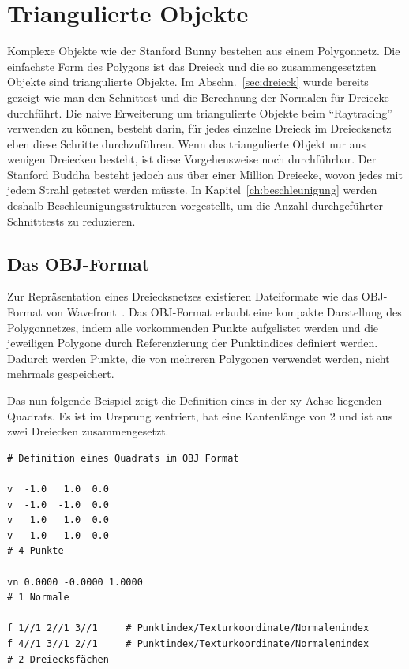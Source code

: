 
\chapter{Triangulierte Objekte}

Komplexe Objekte wie der Stanford Bunny bestehen aus einem Polygonnetz. Die einfachste Form des Polygons ist das Dreieck und die so zusammengesetzten Objekte sind triangulierte Objekte.
Im Abschn.~\ref{sec:dreieck} wurde bereits gezeigt wie man den Schnittest und die Berechnung der Normalen für Dreiecke durchführt.
Die naive Erweiterung um triangulierte Objekte beim "`Raytracing"' verwenden zu können, besteht darin, für jedes einzelne Dreieck im Dreiecksnetz eben diese Schritte durchzuführen. Wenn das triangulierte Objekt nur aus wenigen Dreiecken besteht, ist diese Vorgehensweise noch durchführbar. Der Stanford Buddha besteht jedoch aus über einer Million Dreiecke, wovon jedes mit jedem Strahl getestet werden müsste. In Kapitel~\ref{ch:beschleunigung} werden deshalb Beschleunigungsstrukturen vorgestellt, um die Anzahl durchgeführter Schnitttests zu reduzieren.

\section{Das OBJ-Format}

Zur Repräsentation eines Dreiecksnetzes existieren Dateiformate wie das OBJ-Format von Wavefront~\cite{reddy2015obj}. Das OBJ-Format erlaubt eine kompakte Darstellung des Polygonnetzes, indem alle vorkommenden Punkte aufgelistet werden und die jeweiligen Polygone durch Referenzierung der Punktindices definiert werden. Dadurch werden Punkte, die von mehreren Polygonen verwendet werden, nicht mehrmals gespeichert.

Das nun folgende Beispiel zeigt die Definition eines in der xy-Achse liegenden Quadrats. Es ist im Ursprung zentriert, hat eine Kantenlänge von 2 und ist aus zwei Dreiecken zusammengesetzt.

\begin{verbatim}
# Definition eines Quadrats im OBJ Format

v  -1.0   1.0  0.0
v  -1.0  -1.0  0.0
v   1.0   1.0  0.0
v   1.0  -1.0  0.0
# 4 Punkte

vn 0.0000 -0.0000 1.0000
# 1 Normale

f 1//1 2//1 3//1     # Punktindex/Texturkoordinate/Normalenindex
f 4//1 3//1 2//1     # Punktindex/Texturkoordinate/Normalenindex
# 2 Dreiecksfächen
\end{verbatim}

